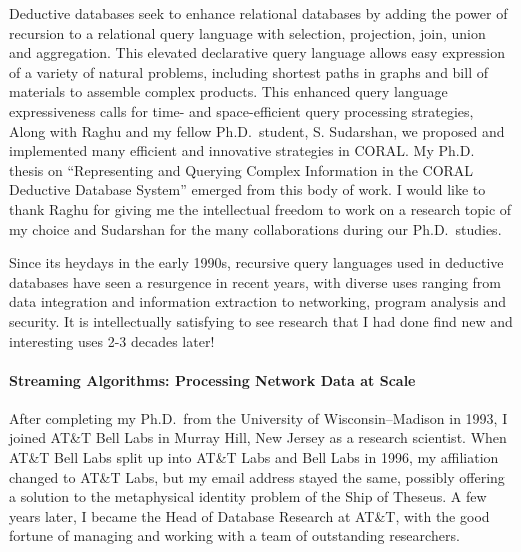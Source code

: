 \documentclass[11pt]{article}
\begin{document}
Deductive databases seek to enhance relational databases by adding the 
power of recursion to a relational query language with selection, 
projection, join, union and aggregation.
This elevated declarative query language allows easy expression of 
a variety of natural problems, including shortest paths in graphs and 
bill of materials to assemble complex products.
This enhanced query language expressiveness calls for time- and 
space-efficient query processing strategies,  
Along with Raghu and my fellow Ph.D.\ student, S. Sudarshan, we proposed
and implemented many efficient and innovative strategies in CORAL.
My Ph.D. thesis on ``Representing and Querying Complex Information in the 
CORAL Deductive Database System'' emerged from this body of work.
I would like to thank Raghu for giving me the intellectual freedom to 
work on a research topic of my choice and Sudarshan for the many 
collaborations during our Ph.D.\ studies.

Since its heydays in the early 1990s, recursive query languages used in
deductive databases have seen a resurgence in recent years, with diverse
uses ranging from data integration and information extraction to 
networking, program analysis and security.
It is intellectually satisfying to see research that I had done find 
new and interesting uses 2-3 decades later!

\paragraph{Streaming Algorithms: Processing Network Data at Scale}
After completing my Ph.D.\ from the University of Wisconsin--Madison 
in 1993, I joined AT\&T Bell Labs in Murray Hill, New Jersey as a 
research scientist.
When AT\&T Bell Labs split up into AT\&T Labs and Bell Labs in 1996, my
affiliation changed to AT\&T Labs, but my email address stayed the same, 
possibly offering a solution to the metaphysical identity problem of 
the Ship of Theseus.
A few years later, I became the Head of Database Research at AT\&T, 
with the good fortune of 
managing and working with a team of outstanding researchers.
\end{document}
